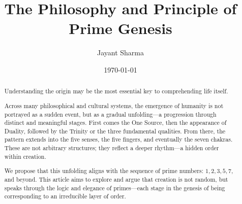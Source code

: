 \documentclass[10pt]{article}
\title{The Philosophy and Principle of Prime Genesis}
\author{Jayant Sharma}
\date{\today}
\begin{document}
\maketitle

\begin{abstract}
Understanding the origin may be the most essential key to comprehending life itself.

Across many philosophical and cultural systems, the emergence of humanity is not portrayed as a sudden event, but as a gradual unfolding—a progression through distinct and meaningful stages. First comes the One Source, then the appearance of Duality, followed by the Trinity or the three fundamental qualities. From there, the pattern extends into the five senses, the five fingers, and eventually the seven chakras. These are not arbitrary structures; they reflect a deeper rhythm—a hidden order within creation.

We propose that this unfolding aligns with the sequence of prime numbers: $1, 2, 3, 5, 7,$ and beyond. This article aims to explore and argue that creation is not random, but speaks through the logic and elegance of primes—each stage in the genesis of being corresponding to an irreducible layer of order.
\end{abstract}




\end{document}
